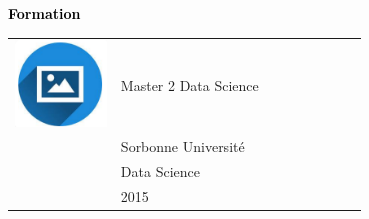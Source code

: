 \documentclass{article}
\begin{document}
\begin{paracol}{2}
\vspace{1cm}

\textcolor{black}{\Large \textbf{Formation}} \\


 \begin{tabular}{@{}cp{0.7\linewidth}}
      \begin{minipage}{0.05\linewidth}
        \includegraphics[width=\linewidth]{picon.png}
      \end{minipage} & \vspace{-12pt}
      {\color{sidetext} Master 2 Data Science} \\[-6pt]
      & Sorbonne Université \\ 
      & Data Science \\ 
      & 2015 
    \end{tabular}

\vspace{0.5cm}


\end{paracol}
\end{document}
